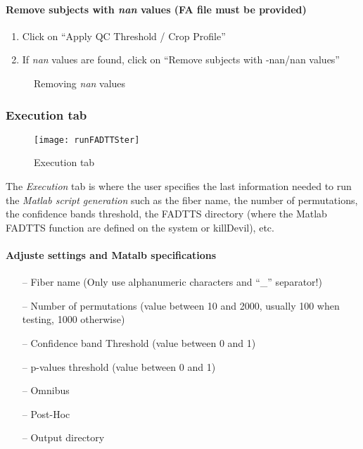 \documentclass[fadttsterUserGuide_use]{subfiles}
\begin{document}
	\paragraph{Remove subjects with \textit{nan} values (FA file must be provided)}
	\begin{enumerate}
		\item Click on ``Apply QC Threshold / Crop Profile''
		\item If \textit{nan} values are found, click on ``Remove subjects with -nan/nan values''
	\end{enumerate}
	\begin{figure}[H]
    	\caption{Removing \textit{nan} values}
    	\label{fig:removeNAN}
	\end{figure}	
	\vfill
	\newpage
	
	
	\subsubsection{Execution tab}
	\begin{figure}[H]
  		\texttt{[image: runFADTTSter]}
  		\caption{Execution tab}
    	\label{fig:runFADTTSter}
	\end{figure}
	The \textit{Execution} tab is where the user specifies the last information needed to run the \emph{Matlab script generation} such as the fiber name, the number of permutations, the confidence bands threshold, the FADTTS directory (where the Matlab FADTTS function are defined on the system or killDevil), etc.
	\vfill
	\newpage
	
	\paragraph{Adjuste settings and Matalb specifications}
	\begin{itemize}
		\item[--] Fiber name (Only use alphanumeric characters and ``\_'' separator!)
		\item[--] Number of permutations (value between 10 and 2000, usually 100 when testing, 1000 otherwise)
		\item[--] Confidence band Threshold (value between 0 and 1)
		\item[--] p-values threshold (value between 0 and 1)
		\item[--] Omnibus
		\item[--] Post-Hoc		
		\item[--] Output directory
	\end{itemize}
		
\end{document}
